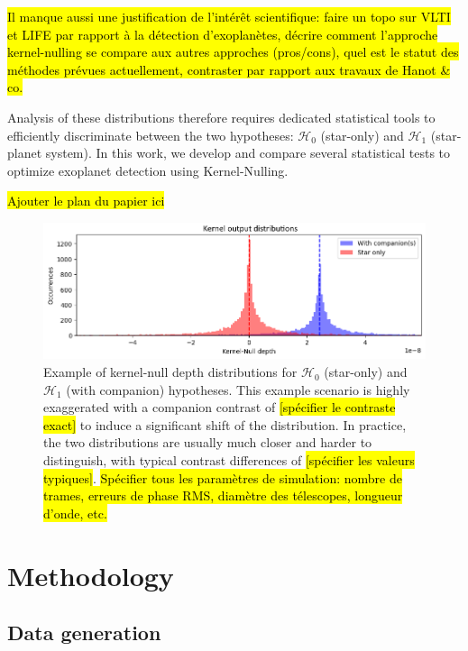 \documentclass{article}
\begin{document}
\hl{Il manque aussi une justification de l'intérêt scientifique: faire un topo sur VLTI et LIFE par rapport à la détection d'exoplanètes, décrire comment l'approche kernel-nulling se compare aux autres approches (pros/cons), quel est le statut des méthodes prévues actuellement, contraster par rapport aux travaux de Hanot \& co.}

Analysis of these distributions therefore requires dedicated statistical tools to efficiently discriminate between the two hypotheses: ${\mathcal{H}}_0$ (star-only) and ${\mathcal{H}}_1$ (star-planet system). In this work, we develop and compare several statistical tests to optimize exoplanet detection using Kernel-Nulling.

\hl{Ajouter le plan du papier ici}

\begin{figure}[H]
\centering
\includegraphics[width=\linewidth]{img/output_distribution.png}
\caption{Example of kernel-null depth distributions for ${\mathcal{H}}_0$ (star-only) and ${\mathcal{H}}_1$ (with companion) hypotheses. This example scenario is highly exaggerated with a companion contrast of \hl{[spécifier le contraste exact]} to induce a significant shift of the distribution. In practice, the two distributions are usually much closer and harder to distinguish, with typical contrast differences of \hl{[spécifier les valeurs typiques]}. \hl{Spécifier tous les paramètres de simulation: nombre de trames, erreurs de phase RMS, diamètre des télescopes, longueur d'onde, etc.}}
\label{fig:distribution}
\end{figure}


\section{Methodology}

\subsection{Data generation}
\end{document}
